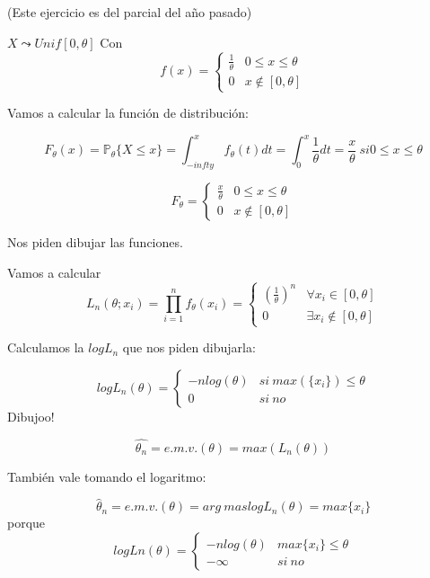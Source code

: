 \pagebreak
\begin{problem}[11]
(Este ejercicio es del parcial del año pasado)

\solution

$X \leadsto Unif[0,\theta]$
Con \[ f(x) = \displaystyle\left\{\begin{array}{cc}
\frac{1}{\theta} & 0\leq x \leq \theta\\
0 & x \notin [0,\theta]
\end{array}\right.\]

Vamos a calcular la función de distribución:

\[F_{\theta} (x) = \mathbb{P}_{\theta}\{X\leq x\} = \int_{-infty}^x f_{\theta}(t)dt = \int_0^x \frac{1}{\theta} dt = \frac{x}{\theta} \ si 0\leq x \leq \theta\]

\[F_{\theta} = \left\{\begin{array}{cc}
\frac{x}{\theta} & 0\leq x \leq \theta\\
0 & x \notin [0,\theta]
\end{array}\right.\]

Nos piden dibujar las funciones. 


Vamos a calcular \[L_n(\theta;x_i) = \prod_{i=1}^n f_{\theta} (x_i) = \left\{\begin{array}{cc}
\left(\frac{1}{\theta}\right)^n & \forall x_i \in [0,\theta]\\
0 & \exists x_i\notin [0,\theta]
\end{array}\right.\]

Calculamos la $logL_n$ que nos piden dibujarla:

\[logL_n(\theta) = \left\{\begin{array}{cc}
-nlog(\theta) & si \ max(\{x_i\})\leq \theta\\
0 & si \ no
\end{array}\right.\]
Dibujoo!

\[\hat{\theta_n} = e.m.v.(\theta) = max\left(L_n(\theta)\right)\]

También vale tomando el logaritmo:

\[\hat{\theta}_n = e.m.v. (\theta) = arg\ mas logL_n(\theta) = max\{x_i\}\]
porque \[ logLn(\theta) = \displaystyle\left\{\begin{array}{cc}
-nlog(\theta) & max\{x_i\} \leq \theta\\
-\infty & si \ no
\end{array}\right.\]
\end{problem}

